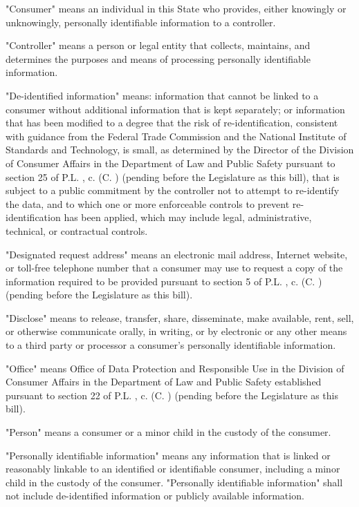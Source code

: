      "Consumer" means an individual in this State who provides, either knowingly or unknowingly, personally identifiable information to a controller.

     "Controller" means a person or legal entity that collects, maintains, and determines the purposes and means of processing personally identifiable information.

     "De-identified information" means: information that cannot be linked to a consumer without additional information that is kept separately; or information that has been modified to a degree that the risk of re-identification, consistent with guidance from the Federal Trade Commission and the National Institute of Standards and Technology, is small, as determined by the Director of the Division of Consumer Affairs in the Department of Law and Public Safety pursuant to section 25 of P.L.    , c.    (C.      ) (pending before the Legislature as this bill), that is subject to a public commitment by the controller not to attempt to re-identify the data, and to which one or more enforceable controls to prevent re-identification has been applied, which may include legal, administrative, technical, or contractual controls.

     "Designated request address" means an electronic mail address, Internet website, or toll-free telephone number that a consumer may use to request a copy of the information required to be provided pursuant to section 5 of P.L.    , c.    (C.      ) (pending before the Legislature as this bill).

     "Disclose" means to release, transfer, share, disseminate, make available, rent, sell, or otherwise communicate orally, in writing, or by electronic or any other means to a third party or processor a consumer's personally identifiable information.

     "Office" means Office of Data Protection and Responsible Use in the Division of Consumer Affairs in the Department of Law and Public Safety established pursuant to section 22 of P.L.    , c.    (C.      ) (pending before the Legislature as this bill).

     "Person" means a consumer or a minor child in the custody of the consumer.

     "Personally identifiable information" means any information that is linked or reasonably linkable to an identified or identifiable consumer, including a minor child in the custody of the consumer. "Personally identifiable information" shall not include de-identified information or publicly available information.

